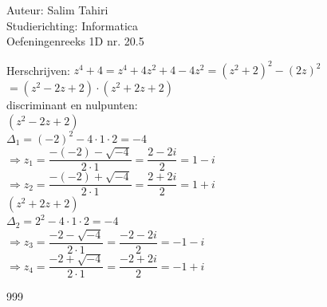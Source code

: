 \documentclass[a4paper]{article}
\begin{document}
  
\noindent \large Auteur: Salim Tahiri \\
\noindent \large Studierichting: Informatica\\
\noindent \large Oefeningenreeks 1D nr. 20.5\\
  
\normalsize

Herschrijven: $z^4 + 4 = z^4 + 4z^2 + 4 - 4z^2 = \left(z^2 + 2\right)^2 - \left(2z\right)^2$\\
  
$= \left(z^2 - 2z + 2\right)\cdot\left(z^2 + 2z + 2\right)$\\
  
discriminant en nulpunten:\\
  
$\left(z^2 - 2z + 2\right)$\\
  
$\Delta_1 = \left(-2\right)^2 - 4\cdot 1 \cdot 2 = -4$ \\
  
$\Rightarrow z_1 = \dfrac{-\left(-2\right) - \sqrt{-4}}{2\cdot 1} = \dfrac{2 - 2i}{2} = 1 - i$ \\
  
$\Rightarrow z_2 = \dfrac{-\left(-2\right) + \sqrt{-4}}{2\cdot 1} = \dfrac{2 + 2i}{2} = 1 + i$ \\
  
$\left(z^2 + 2z + 2\right)$ \\
  
$\Delta_2 = 2^2 - 4\cdot 1 \cdot 2 = -4$ \\
  
$\Rightarrow z_3 = \dfrac{-2 - \sqrt{-4}}{2\cdot 1} = \dfrac{-2 - 2i}{2} = -1 - i$ \\
  
$\Rightarrow z_4 = \dfrac{-2 + \sqrt{-4}}{2\cdot 1} = \dfrac{-2 + 2i}{2} = -1 + i$ \\
  
\begin{thebibliography}{999}
\end{thebibliography}
\end{document}
